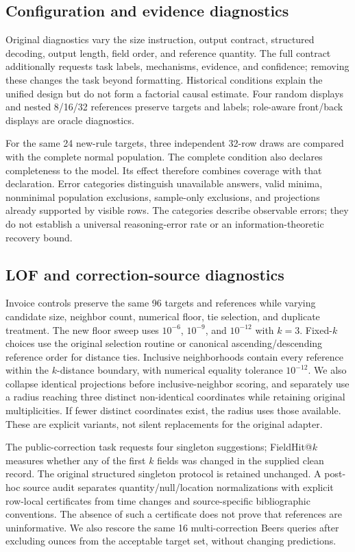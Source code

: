 \documentclass[conference]{IEEEtran}
\begin{document}
\subsection{Configuration and evidence diagnostics}
Original diagnostics vary the size instruction, output contract, structured decoding, output length, field order, and reference quantity. The full contract additionally requests task labels, mechanisms, evidence, and confidence; removing these changes the task beyond formatting. Historical conditions explain the unified design but do not form a factorial causal estimate. Four random displays and nested 8/16/32 references preserve targets and labels; role-aware front/back displays are oracle diagnostics.

For the same 24 new-rule targets, three independent 32-row draws are compared with the complete normal population. The complete condition also declares completeness to the model. Its effect therefore combines coverage with that declaration. Error categories distinguish unavailable answers, valid minima, nonminimal population exclusions, sample-only exclusions, and projections already supported by visible rows. The categories describe observable errors; they do not establish a universal reasoning-error rate or an information-theoretic recovery bound.

\subsection{LOF and correction-source diagnostics}
Invoice controls preserve the same 96 targets and references while varying candidate size, neighbor count, numerical floor, tie selection, and duplicate treatment. The new floor sweep uses $10^{-6}$, $10^{-9}$, and $10^{-12}$ with $k=3$. Fixed-$k$ choices use the original selection routine or canonical ascending/descending reference order for distance ties. Inclusive neighborhoods contain every reference within the $k$-distance boundary, with numerical equality tolerance $10^{-12}$. We also collapse identical projections before inclusive-neighbor scoring, and separately use a radius reaching three distinct non-identical coordinates while retaining original multiplicities. If fewer distinct coordinates exist, the radius uses those available. These are explicit variants, not silent replacements for the original adapter.

The public-correction task requests four singleton suggestions; FieldHit@$k$ measures whether any of the first $k$ fields was changed in the supplied clean record. The original structured singleton protocol is retained unchanged. A post-hoc source audit separates quantity/null/location normalizations with explicit row-local certificates from time changes and source-specific bibliographic conventions. The absence of such a certificate does not prove that references are uninformative. We also rescore the same 16 multi-correction Beers queries after excluding ounces from the acceptable target set, without changing predictions.
\end{document}
